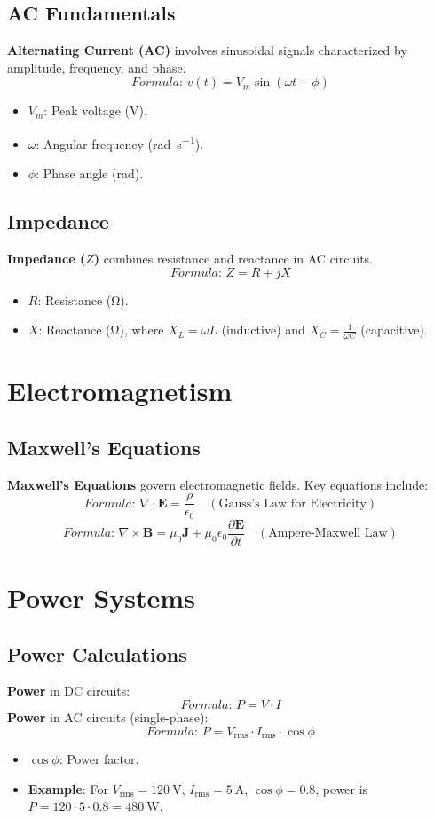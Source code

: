 \documentclass[12pt]{article}
\newcommand{\concept}[1]{\textbf{#1}}
\newcommand{\formula}[1]{\textit{Formula: }#1}
\begin{document}
\subsection{AC Fundamentals}
\concept{Alternating Current (AC)} involves sinusoidal signals characterized by amplitude, frequency, and phase.
\[
\formula{v(t) = V_m \sin(\omega t + \phi)}
\]
\begin{itemize}
    \item \(V_m\): Peak voltage (\si{\volt}).
    \item \(\omega\): Angular frequency (\si{\radian\per\second}).
    \item \(\phi\): Phase angle (\si{\radian}).
\end{itemize}

\subsection{Impedance}
\concept{Impedance (\(Z\))} combines resistance and reactance in AC circuits.
\[
\formula{Z = R + jX}
\]
\begin{itemize}
    \item \(R\): Resistance (\si{\ohm}).
    \item \(X\): Reactance (\si{\ohm}), where \(X_L = \omega L\) (inductive) and \(X_C = \frac{1}{\omega C}\) (capacitive).
\end{itemize}

\section{Electromagnetism}
\subsection{Maxwell's Equations}
\concept{Maxwell's Equations} govern electromagnetic fields. Key equations include:
\[
\formula{\nabla \cdot \mathbf{E} = \frac{\rho}{\epsilon_0}} \quad (\text{Gauss's Law for Electricity})
\]
\[
\formula{\nabla \times \mathbf{B} = \mu_0 \mathbf{J} + \mu_0 \epsilon_0 \frac{\partial \mathbf{E}}{\partial t}} \quad (\text{Ampere-Maxwell Law})
\]

\section{Power Systems}
\subsection{Power Calculations}
\concept{Power} in DC circuits:
\[
\formula{P = V \cdot I}
\]
\concept{Power} in AC circuits (single-phase):
\[
\formula{P = V_{\text{rms}} \cdot I_{\text{rms}} \cdot \cos\phi}
\]
\begin{itemize}
    \item \(\cos\phi\): Power factor.
    \item \textbf{Example}: For \(V_{\text{rms}} = \SI{120}{\volt}\), \(I_{\text{rms}} = \SI{5}{\ampere}\), \(\cos\phi = 0.8\), power is \(P = 120 \cdot 5 \cdot 0.8 = \SI{480}{\watt}\).
\end{itemize}
\end{document}
